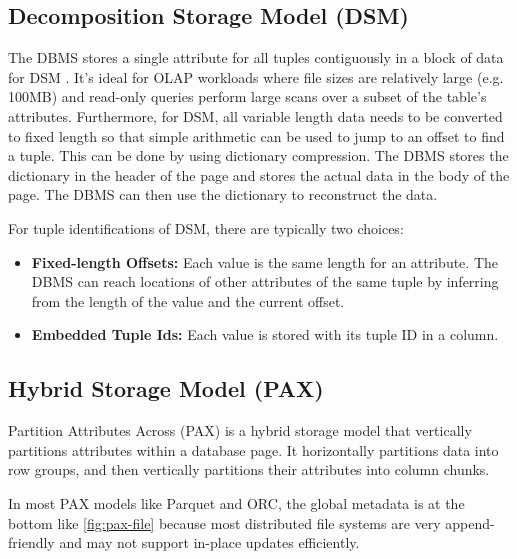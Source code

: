 \documentclass[11pt]{article}
\begin{document}
\subsection*{Decomposition Storage Model (DSM)}

The DBMS stores a single attribute for all tuples contiguously in a block of data for DSM \cite{10.1145/1376616.1376712}. It's ideal for OLAP workloads where file sizes are relatively large (e.g. 100MB) and read-only queries perform large scans over a subset of the table's attributes. Furthermore, for DSM, all variable length data needs to be converted to fixed length so that simple arithmetic can be used to jump to an offset to find a tuple. This can be done by using dictionary compression. The DBMS stores the dictionary in the header of the page and stores the actual data in the body of the page. The DBMS can then use the dictionary to reconstruct the data.

For tuple identifications of DSM, there are typically two choices:

\begin{itemize}
    \item \textbf{Fixed-length Offsets:} Each value is the same length for an attribute. The DBMS can reach locations of other attributes of the same tuple by inferring from the length of the value and the current offset.
    \item \textbf{Embedded Tuple Ids:} Each value is stored with its tuple ID in a column.
\end{itemize}

\subsection*{Hybrid Storage Model (PAX)}

Partition Attributes Across (PAX) is a hybrid storage model that vertically partitions attributes within a database page. It horizontally partitions data into row groups, and then vertically partitions their attributes into column chunks.

In most PAX models like Parquet \cite{zeng2023empirical} and ORC, the global metadata is at the bottom like \cref{fig:pax-file} because most distributed file systems are very append-friendly and may not support in-place updates efficiently. 
\end{document}
